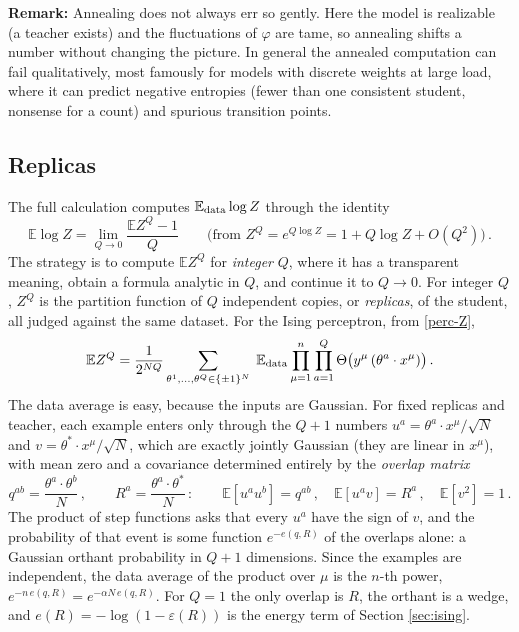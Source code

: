 \documentclass[11pt]{article}
\newcommand{\E}{\mathbb{E}}
\begin{document}
\smallskip
\textbf{Remark:} Annealing does not always err so gently. Here the model is realizable (a teacher exists) and the fluctuations of $\varphi$ are tame, so annealing shifts a number without changing the picture. In general the annealed computation can fail qualitatively, most famously for models with discrete weights at large load, where it can predict negative entropies (fewer than one consistent student, nonsense for a count) and spurious transition points.

\subsection{Replicas}
\label{app:replica-method}

The full calculation computes $\E_{\rm data}\log Z$ through the identity
%
\begin{equation}
    \E\log Z = \lim_{Q\to0}\frac{\E Z^Q - 1}{Q}\qquad\big(\text{from } Z^Q = e^{Q\log Z} = 1 + Q\log Z + O(Q^2)\big)\,. \label{replica-identity}
\end{equation}
%
The strategy is to compute $\E Z^Q$ for \emph{integer} $Q$, where it has a transparent meaning, obtain a formula analytic in $Q$, and continue it to $Q\to0$. For integer $Q$, $Z^Q$ is the partition function of $Q$ independent copies, or \emph{replicas}, of the student, all judged against the same dataset. For the Ising perceptron, from \eqref{perc-Z},
%
\begin{equation}
    \E Z^Q = \frac{1}{2^{NQ}}\sum_{\theta^1,\ldots,\theta^Q\in\{\pm1\}^N}\;\E_{\rm data}\prod_{\mu=1}^n\prod_{a=1}^Q\Theta\big(y^\mu\,(\theta^a\cdot x^\mu)\big)\,. \label{EZn}
\end{equation}
%
The data average is easy, because the inputs are Gaussian. For fixed replicas and teacher, each example enters only through the $Q+1$ numbers $u^a = \theta^a\cdot x^\mu/\sqrt N$ and $v = \theta^*\cdot x^\mu/\sqrt N$, which are exactly jointly Gaussian (they are linear in $x^\mu$), with mean zero and a covariance determined entirely by the \emph{overlap matrix}
%
\begin{equation}
    q^{ab} = \frac{\theta^a\cdot\theta^b}{N}\,,\qquad R^a = \frac{\theta^a\cdot\theta^*}{N}\,:\qquad
    \E[u^au^b] = q^{ab}\,,\quad \E[u^av] = R^a\,,\quad \E[v^2] = 1\,. \label{overlap-matrix}
\end{equation}
%
The product of step functions asks that every $u^a$ have the sign of $v$, and the probability of that event is some function $e^{-e(q,R)}$ of the overlaps alone: a Gaussian orthant probability in $Q+1$ dimensions. Since the examples are independent, the data average of the product over $\mu$ is the $n$-th power, $e^{-n\,e(q,R)} = e^{-\alpha N\,e(q,R)}$. For $Q=1$ the only overlap is $R$, the orthant is a wedge, and $e(R) = -\log(1-\varepsilon(R))$ is the energy term of Section \ref{sec:ising}.
\end{document}
